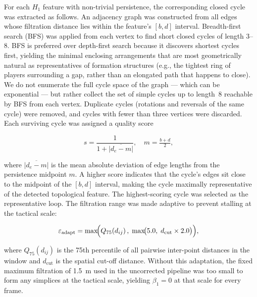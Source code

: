\documentclass[11pt,a4paper]{article}
\begin{document}
For each \(H_1\) feature with non-trivial persistence,
the corresponding closed cycle was extracted as follows.
An adjacency graph was constructed from all edges whose
filtration distance lies within the feature's
\([b, d]\) interval.  Breadth-first search (BFS) was applied
from each vertex to find short closed cycles of length 3--8.
BFS is preferred over depth-first search because it discovers
shortest cycles first, yielding the minimal enclosing
arrangements that are most geometrically natural as
representatives of formation structures (e.g., the tightest
ring of players surrounding a gap, rather than an elongated
path that happens to close).  We do not enumerate the full
cycle space of the graph --- which can be exponential --- but
rather collect the set of simple cycles up to length~8
reachable by BFS from each vertex.  Duplicate cycles
(rotations and reversals of the same cycle) were removed,
and cycles with fewer than three vertices were discarded.
Each surviving cycle was assigned a quality score

\begin{equation}
  s = \frac{1}{1 + \overline{\lvert d_e - m \rvert}},
  \quad m = \tfrac{b + d}{2},
\label{eq:score}
\end{equation}

\noindent
where \(\overline{\lvert d_e - m \rvert}\) is the mean
absolute deviation of edge lengths from the persistence
midpoint \(m\).  A higher score indicates that the cycle's
edges sit close to the midpoint of the \([b, d]\) interval,
making the cycle maximally representative of the detected
topological feature.  The highest-scoring cycle was
selected as the representative loop.  The filtration range
was made adaptive to prevent stalling at the tactical scale:

\begin{equation}
  \varepsilon_{\text{adapt}} =
    \max\!\Bigl(
      Q_{75}\!\left(d_{ij}\right),\;
      \max\!\bigl(5.0,\; d_{\text{cut}} \times 2.0\bigr)
    \Bigr),
\label{eq:adaptive}
\end{equation}

\noindent
where \(Q_{75}(d_{ij})\) is the 75th percentile of all
pairwise inter-point distances in the window and
\(d_{\text{cut}}\) is the spatial cut-off distance.  Without
this adaptation, the fixed maximum filtration of 1.5~m used
in the uncorrected pipeline was too small to form any
simplices at the tactical scale, yielding \(\beta_1 = 0\)
at that scale for every frame.

\end{document}
